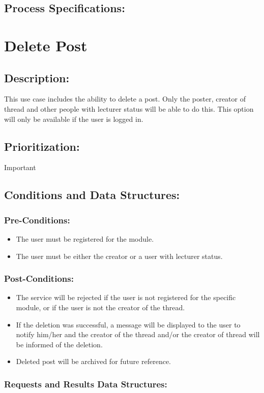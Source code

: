 \documentclass[a4paper,11pt]{article}
\begin{document}
\subsection{Process Specifications:} 

\section{Delete Post}
\subsection*{Description:}This use case includes the ability to delete a post. Only the poster, creator of thread and other people with lecturer status will be able to do this.
This option will only be available if the user is logged in.
\subsection{Prioritization:}Important
\subsection{Conditions and Data Structures:}
\subsubsection*{Pre-Conditions:}
\begin{itemize}
	\item The user must be registered for the module.
	\item The user must be either the creator or a user with lecturer status.
\end{itemize}
\subsubsection*{Post-Conditions:}
\begin{itemize}
	\item The service will be rejected if the user is not registered for the specific module, or if the user is not the creator of the thread.
	\item If the deletion was successful, a message will be displayed to the user to notify him/her and the creator of the thread and/or the creator of thread will be informed of the deletion.
	\item Deleted post will be archived for future reference.
\end{itemize}
\subsubsection*{Requests and Results Data Structures:}
\end{document}
